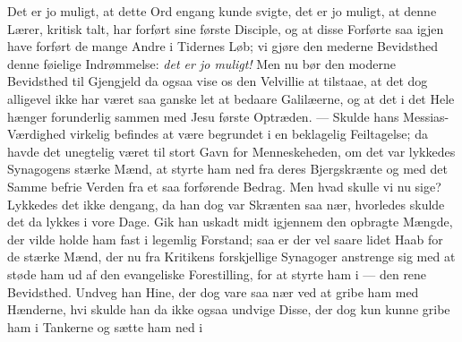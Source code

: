\documentclass[12pt,a4paper]{book}
\begin{document}
Det er jo muligt, at dette Ord engang kunde svigte, det er jo muligt, at denne Lærer,
kritisk talt, har forført sine første Disciple, og at disse Forførte saa igjen have
forført de mange Andre i Tidernes Løb; vi gjøre den mederne Bevidsthed denne føielige
Indrømmelse: \emph{det er jo muligt!} Men nu bør den moderne
Bevidsthed til Gjengjeld da ogsaa vise os den Velvillie at tilstaae, at det dog alligevel
ikke har været saa ganske let at bedaare Galilæerne, og at det i det Hele hænger
forunderlig sammen med Jesu første Optræden. --- Skulde hans Messias-Værdighed virkelig
befindes at være begrundet i en beklagelig Feiltagelse; da havde det unegtelig været til
stort Gavn for Menneskeheden, om det var lykkedes Synagogens stærke Mænd, at styrte ham
ned fra deres Bjergskrænte og med det Samme befrie Verden fra et saa forførende Bedrag.
Men hvad skulle vi nu sige? Lykkedes det ikke dengang, da han dog var Skrænten saa nær,
hvorledes skulde det da lykkes i vore Dage. Gik han uskadt midt igjennem den opbragte
Mængde, der vilde holde ham fast i legemlig Forstand; saa er der vel saare lidet Haab for
de stærke Mænd, der nu fra Kritikens forskjellige Synagoger anstrenge sig med at støde
ham ud af den evangeliske Forestilling, for at styrte ham i --- den rene Bevidsthed.
Undveg han Hine, der dog vare saa nær ved at gribe ham med Hænderne, hvi skulde han da
ikke ogsaa undvige Disse, der dog kun kunne gribe ham i Tankerne og sætte ham ned i
\end{document}
